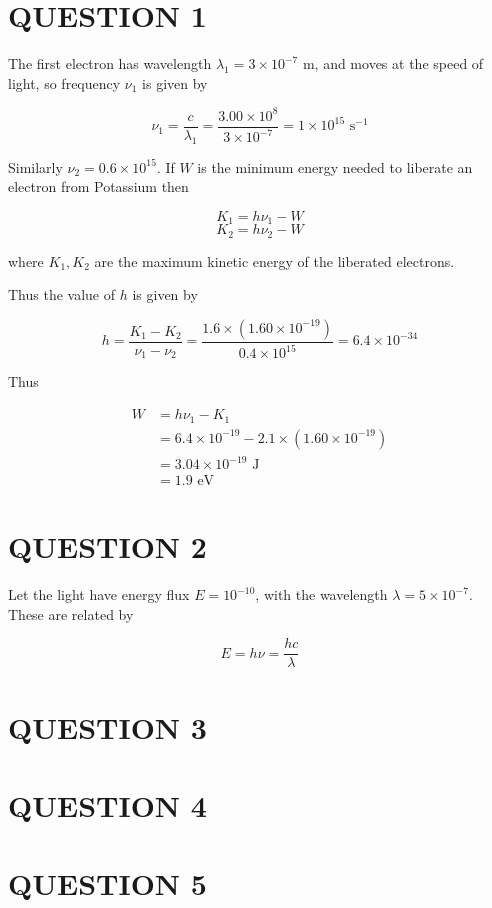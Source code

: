 \documentclass[a4paper]{article}
\begin{document}
	
\maketitle

\section{QUESTION 1}

The first electron has wavelength $ \lambda_{1} = 3 \times 10^{-7} $ m, and moves at the speed of light, so frequency $ \nu_{1} $ is given by

\[ \nu_{1} = \frac{c}{\lambda_{1}} = \frac{3.00 \times 10^{8}}{3 \times 10^{-7}} = 1 \times 10^{15} \text{ s}^{-1}  \]

Similarly $ \nu_{2} =  0.6 \times 10^{15} $. If $ W $ is the minimum energy needed to liberate an electron from Potassium then

\[ K_{1} = h \nu_{1} - W \]
\[  K_{2} = h \nu_{2} - W \]

where $ K_{1},K_{2} $ are the maximum kinetic energy of the liberated electrons. 

Thus the value of $ h $ is given by

\[ h = \frac{K_{1} - K_{2}}{\nu_{1} - \nu_{2}} = \frac{1.6 \times (1.60 \times 10^{-19})}{0.4 \times 10^{15}} = 6.4 \times 10^{-34}\]

Thus 


\begin{align*}
W & = h\nu_{1} - K_{1} \\
& = 6.4 \times 10^{-19} - 2.1 \times (1.60 \times 10^{-19}) \\
& = 3.04 \times 10^{-19} \text{ J} \\
& = 1.9 \text{ eV}
\end{align*}

\section{QUESTION 2}

Let the light have energy flux $ E = 10^{-10} $, with the wavelength $ \lambda = 5 \times 10^{-7} $. These are related by

\[ E = h \nu = \frac{h c}{\lambda}  \]





\section{QUESTION 3}
\section{QUESTION 4}
\section{QUESTION 5}
\end{document}
